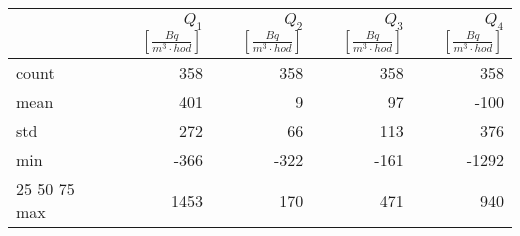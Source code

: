 \begin{tabular}{lrrrr}
\toprule
{} &  $Q_1$ $\left[\si{\frac{Bq}{m^3\cdot hod}}\right]$ &  $Q_2$ $\left[\si{\frac{Bq}{m^3\cdot hod}}\right]$ &  $Q_3$ $\left[\si{\frac{Bq}{m^3\cdot hod}}\right]$ &  $Q_4$ $\left[\si{\frac{Bq}{m^3\cdot hod}}\right]$ \\
\midrule
count &                                                358 &                                                358 &                                                358 &                                                358 \\
mean  &                                                401 &                                                  9 &                                                 97 &                                               -100 \\
std   &                                                272 &                                                 66 &                                                113 &                                                376 \\
min   &                                               -366 &                                               -322 &                                               -161 &                                              -1292 \\
25%
50%
75%
max   &                                               1453 &                                                170 &                                                471 &                                                940 \\
\bottomrule
\end{tabular}
